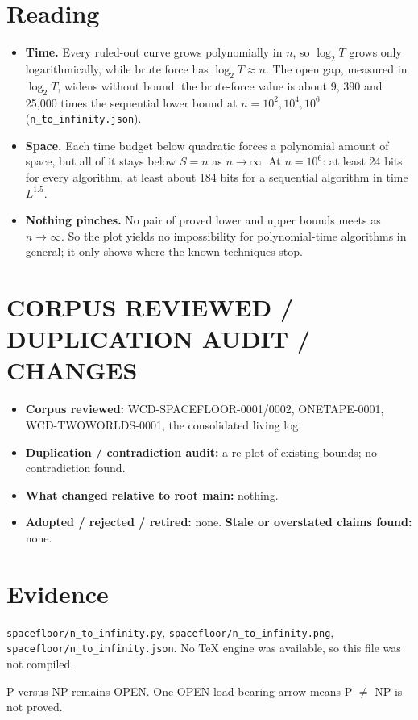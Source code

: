 \documentclass[11pt]{article}
\begin{document}
\section{Reading}
\begin{itemize}
\item \textbf{Time.} Every ruled-out curve grows polynomially in $n$, so $\log_2T$ grows only logarithmically, while brute force has $\log_2T\approx n$. The open gap, measured in $\log_2T$, widens without bound: the brute-force value is about 9, 390 and 25{,}000 times the sequential lower bound at $n=10^{2},10^{4},10^{6}$ (\texttt{n\_to\_infinity.json}).
\item \textbf{Space.} Each time budget below quadratic forces a polynomial amount of space, but all of it stays below $S=n$ as $n\to\infty$. At $n=10^{6}$: at least 24 bits for every algorithm, at least about 184 bits for a sequential algorithm in time $L^{1.5}$.
\item \textbf{Nothing pinches.} No pair of proved lower and upper bounds meets as $n\to\infty$. So the plot yields no impossibility for polynomial-time algorithms in general; it only shows where the known techniques stop.
\end{itemize}

\section{CORPUS REVIEWED / DUPLICATION AUDIT / CHANGES}
\begin{itemize}
\item \textbf{Corpus reviewed:} WCD-SPACEFLOOR-0001/0002, ONETAPE-0001, WCD-TWOWORLDS-0001, the consolidated living log.
\item \textbf{Duplication / contradiction audit:} a re-plot of existing bounds; no contradiction found.
\item \textbf{What changed relative to root main:} nothing.
\item \textbf{Adopted / rejected / retired:} none. \textbf{Stale or overstated claims found:} none.
\end{itemize}

\section{Evidence}
\texttt{spacefloor/n\_to\_infinity.py}, \texttt{spacefloor/n\_to\_infinity.png}, \texttt{spacefloor/n\_to\_infinity.json}. No TeX engine was available, so this file was not compiled.

\medskip\noindent P versus NP remains OPEN. One OPEN load-bearing arrow means P $\ne$ NP is not proved.
\end{document}
